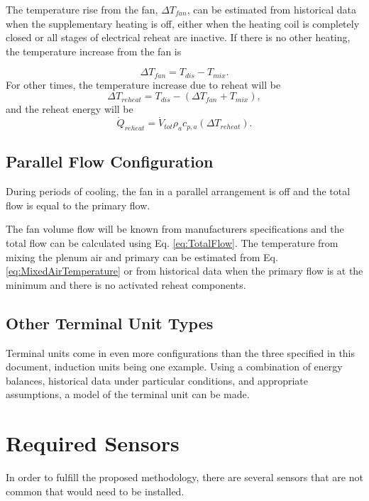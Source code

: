 The temperature rise from the fan, \(\Delta T_{fan}\), can be estimated from historical data when the supplementary heating is off, either when the heating coil is completely closed or all stages of electrical reheat are inactive. If there is no other heating, the temperature increase from the fan is

\begin{equation}
\Delta {T_{fan}} = {T_{dis}} - {T_{mix}}.
\end{equation}
%
For other times, the temperature increase due to reheat will be
%
\begin{equation}
\Delta {T_{reheat}} = {T_{dis}} - \left( {\Delta {T_{fan}} + {T_{mix}}} \right),
\end{equation}
%
and the reheat energy will be
%
\begin{equation}
{\dot Q_{reheat}} = {\dot V_{tot}}{\rho _a}{c_{p,a}}\left( {\Delta {T_{reheat}}} \right).
\end{equation}

\subsection{Parallel Flow Configuration}

During periods of cooling, the fan in a parallel arrangement is off and the total flow is equal to the primary flow.

The fan volume flow will be known from manufacturers specifications and the total flow can be calculated using Eq. \eqref{eq:TotalFlow}. The temperature from mixing the plenum air and primary can be estimated from Eq. \eqref{eq:MixedAirTemperature} or from historical data when the primary flow is at the minimum and there is no activated reheat components.

\subsection{Other Terminal Unit Types}

Terminal units come in even more configurations than the three specified in this document, induction units being one example. Using a combination of energy balances, historical data under particular conditions, and appropriate assumptions, a model of the terminal unit can be made. 
\section{Required Sensors}

In order to fulfill the proposed methodology, there are several sensors that are not common that would need to be installed. 

